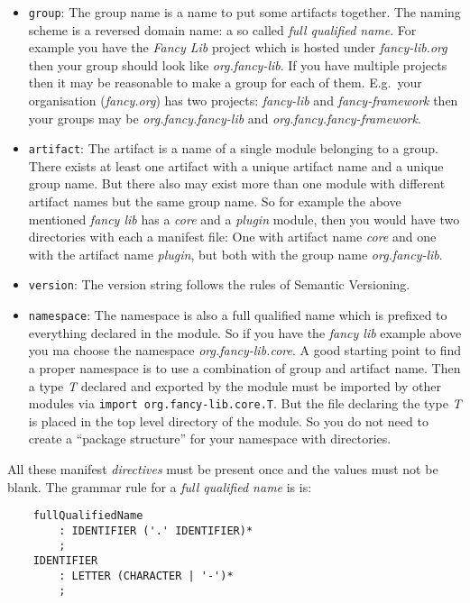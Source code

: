 \documentclass[11pt,a4paper]{report}
\begin{document}
\begin{itemize}
    \item \texttt{group}: The group name is a name to put some artifacts together. The naming scheme is a reversed domain name: a so called \textit{full qualified name}. For example you have the \textit{Fancy Lib} project which is hosted under \textit{fancy-lib.org} then your group should look like \textit{org.fancy-lib}. If you have multiple projects then it may be reasonable to make a group for each of them. E.g.\ your organisation (\textit{fancy.org}) has two projects: \textit{fancy-lib} and \textit{fancy-framework} then your groups may be \textit{org.fancy.fancy-lib} and \textit{org.fancy.fancy-framework}.
    \item \texttt{artifact}: The artifact is a name of a single module belonging to a group. There exists at least one artifact with a unique artifact name and a unique group name. But there also may exist more than one module with different artifact names but the same group name. So for example the above mentioned \textit{fancy lib} has a \textit{core} and a \textit{plugin} module, then you would have two directories with each a manifest file: One with artifact name \textit{core} and one with the artifact name \textit{plugin}, but both with the group name \textit{org.fancy-lib}.
    \item \texttt{version}: The version string follows the rules of Semantic Versioning\cite{semver}.
    \item \texttt{namespace}: The namespace is also a full qualified name which is prefixed to everything declared in the module. So if you have the \textit{fancy lib} example above you ma choose the namespace \textit{org.fancy-lib.core}. A good starting point to find a proper namespace is to use a combination of group and artifact name. Then a type \textit{T} declared and exported by the module must be imported by other modules via \texttt{import org.fancy-lib.core.T}. But the file declaring the type \textit{T} is placed in the top level directory of the module. So you do not need to create a ``package structure'' for your namespace with directories. 
\end{itemize}

All these manifest \textit{directives} must be present once and the values must not be blank. The grammar rule for a \textit{full qualified name} is is: 

\begin{lstlisting}
    fullQualifiedName 
        : IDENTIFIER ('.' IDENTIFIER)*
        ;
    IDENTIFIER 
        : LETTER (CHARACTER | '-')*
        ;
\end{lstlisting}
\end{document}
